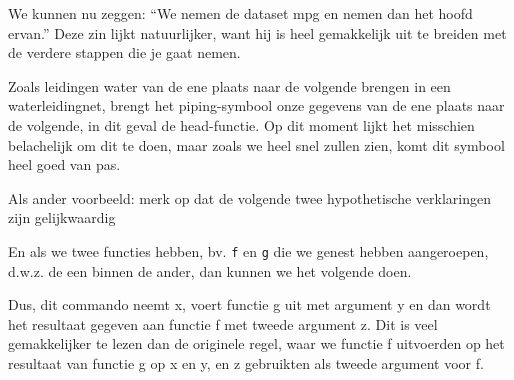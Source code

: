 \documentclass[]{tufte-book}
\newenvironment{Shaded}{}{}
\newcommand{\CommentTok}[1]{\textcolor[rgb]{0.38,0.63,0.69}{\textit{#1}}}
\newcommand{\KeywordTok}[1]{\textcolor[rgb]{0.00,0.44,0.13}{\textbf{#1}}}
\newcommand{\NormalTok}[1]{#1}
\newcommand{\OperatorTok}[1]{\textcolor[rgb]{0.40,0.40,0.40}{#1}}
\newcommand{\StringTok}[1]{\textcolor[rgb]{0.25,0.44,0.63}{#1}}
\begin{document}
\begin{Shaded}
\end{Shaded}

We kunnen nu zeggen: ``We nemen de dataset mpg en nemen dan het hoofd ervan.'' Deze zin lijkt natuurlijker, want hij is heel gemakkelijk uit te breiden met de verdere stappen die je gaat nemen.

Zoals leidingen water van de ene plaats naar de volgende brengen in een waterleidingnet, brengt het piping-symbool onze gegevens van de ene plaats naar de volgende, in dit geval de head-functie. Op dit moment lijkt het misschien belachelijk om dit te doen, maar zoals we heel snel zullen zien, komt dit symbool heel goed van pas.

Als ander voorbeeld: merk op dat de volgende twee hypothetische verklaringen zijn gelijkwaardig

\begin{Shaded}
\end{Shaded}

En als we twee functies hebben, bv. \texttt{f} en \texttt{g} die we genest hebben aangeroepen, d.w.z. de een binnen de ander, dan kunnen we het volgende doen.

\begin{Shaded}
\end{Shaded}

Dus, dit commando neemt x, voert functie g uit met argument y en dan wordt het resultaat gegeven aan functie f met tweede argument z. Dit is veel gemakkelijker te lezen dan de originele regel, waar we functie f uitvoerden op het resultaat van functie g op x en y, en z gebruikten als tweede argument voor f.
\end{document}
